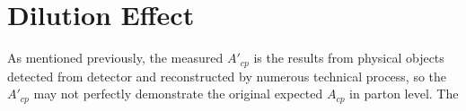 

\section{Dilution Effect}
\label{sec:Dilution}
	
	As mentioned previously, the measured $A'_{cp}$ is the results from physical objects detected from detector and reconstructed by numerous technical process, so the $A'_{cp}$ may not perfectly demonstrate the original expected $A_{cp}$ in parton level. The 


\FloatBarrier
